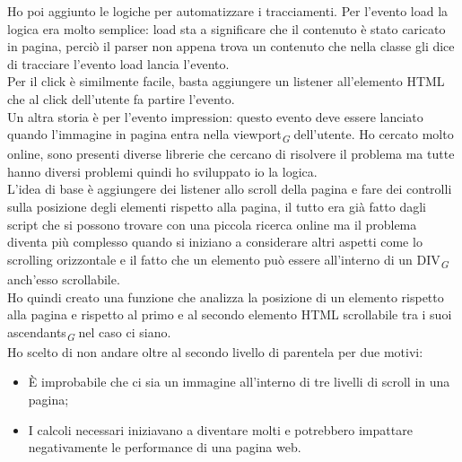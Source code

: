 \documentclass[a4paper, 12pt, twoside, openright]{book}
\newcommand{\gloss}[1]{#1\textsubscript{\textit{\tiny{G}}}}
\begin{document}
Ho poi aggiunto le logiche per automatizzare i tracciamenti. Per l'evento load la logica era molto semplice: load sta a significare che il contenuto è stato caricato in pagina, perciò il parser non appena trova un contenuto che nella classe gli dice di tracciare l'evento load lancia l'evento.\\
Per il click è similmente facile, basta aggiungere un listener all'elemento HTML che al click dell'utente fa partire l'evento.\\
Un altra storia è per l'evento impression: questo evento deve essere lanciato quando l'immagine in pagina entra nella \gloss{viewport} dell'utente. Ho cercato molto online, sono presenti diverse librerie che cercano di risolvere il problema ma tutte hanno diversi problemi quindi ho sviluppato io la logica.\\
L'idea di base è aggiungere dei listener allo scroll della pagina e fare dei controlli sulla posizione degli elementi rispetto alla pagina, il tutto era già fatto dagli script che si possono trovare con una piccola ricerca online ma il problema diventa più complesso quando si iniziano a considerare altri aspetti come lo scrolling orizzontale e il fatto che un elemento può essere all'interno di un \gloss{DIV} anch'esso scrollabile.\\
Ho quindi creato una funzione che analizza la posizione di un elemento rispetto alla pagina e rispetto al primo e al secondo elemento HTML scrollabile tra i suoi \gloss{ascendants} nel caso ci siano.\\
Ho scelto di non andare oltre al secondo livello di parentela per due motivi:
\begin{itemize}
	\item \`{E} improbabile che ci sia un immagine all'interno di tre livelli di scroll in una pagina;
	\item I calcoli necessari iniziavano a diventare molti e potrebbero impattare negativamente le performance di una pagina web.
\end{itemize}
\end{document}
